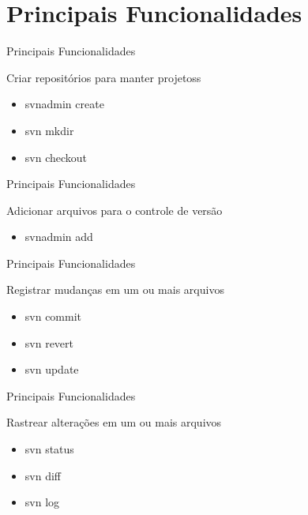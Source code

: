 \section{Principais Funcionalidades}

\begin{frame}{Principais Funcionalidades}
\begin{block}{Criar repositórios para manter projetoss}
  \begin{itemize}
    \item<1-> svnadmin create
    \item<1->svn mkdir
    \item<1->svn checkout
  \end{itemize}
\end{block}
\end{frame}

\begin{frame}{Principais Funcionalidades}
\begin{block}{Adicionar arquivos para o controle de versão}
  \begin{itemize}
    \item<1-> svnadmin add
  \end{itemize}
\end{block}
\end{frame}

\begin{frame}{Principais Funcionalidades}
\begin{block}{Registrar mudanças em um ou mais arquivos}
  \begin{itemize}
    \item<1-> svn commit
    \item<1-> svn revert
    \item<1-> svn update
  \end{itemize}
\end{block}
\end{frame}

\begin{frame}{Principais Funcionalidades}
\begin{block}{Rastrear alterações em  um ou mais arquivos}
  \begin{itemize}
    \item<1-> svn status
    \item<1-> svn diff
    \item<1-> svn log
  \end{itemize}
\end{block}
\end{frame}

